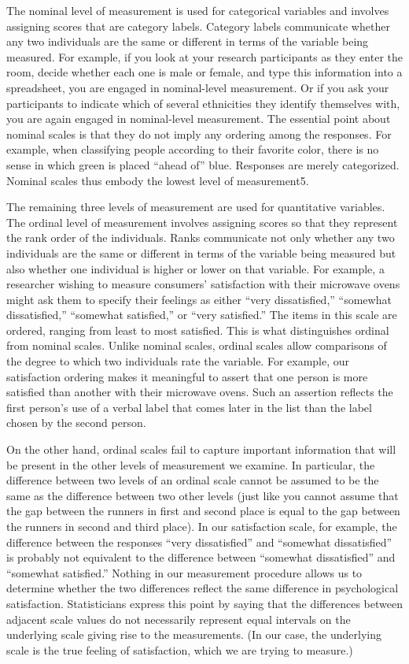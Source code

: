 \documentclass[]{book}
\theoremstyle{definition}
\theoremstyle{definition}
\theoremstyle{remark}
\begin{document}
The nominal level of measurement is used for categorical variables and
involves assigning scores that are category labels. Category labels
communicate whether any two individuals are the same or different in
terms of the variable being measured. For example, if you look at your
research participants as they enter the room, decide whether each one is
male or female, and type this information into a spreadsheet, you are
engaged in nominal-level measurement. Or if you ask your participants to
indicate which of several ethnicities they identify themselves with, you
are again engaged in nominal-level measurement. The essential point
about nominal scales is that they do not imply any ordering among the
responses. For example, when classifying people according to their
favorite color, there is no sense in which green is placed ``ahead of''
blue. Responses are merely categorized. Nominal scales thus embody the
lowest level of measurement5.

The remaining three levels of measurement are used for quantitative
variables. The ordinal level of measurement involves assigning scores so
that they represent the rank order of the individuals. Ranks communicate
not only whether any two individuals are the same or different in terms
of the variable being measured but also whether one individual is higher
or lower on that variable. For example, a researcher wishing to measure
consumers' satisfaction with their microwave ovens might ask them to
specify their feelings as either ``very dissatisfied,'' ``somewhat
dissatisfied,'' ``somewhat satisfied,'' or ``very satisfied.'' The items
in this scale are ordered, ranging from least to most satisfied. This is
what distinguishes ordinal from nominal scales. Unlike nominal scales,
ordinal scales allow comparisons of the degree to which two individuals
rate the variable. For example, our satisfaction ordering makes it
meaningful to assert that one person is more satisfied than another with
their microwave ovens. Such an assertion reflects the first person's use
of a verbal label that comes later in the list than the label chosen by
the second person.

On the other hand, ordinal scales fail to capture important information
that will be present in the other levels of measurement we examine. In
particular, the difference between two levels of an ordinal scale cannot
be assumed to be the same as the difference between two other levels
(just like you cannot assume that the gap between the runners in first
and second place is equal to the gap between the runners in second and
third place). In our satisfaction scale, for example, the difference
between the responses ``very dissatisfied'' and ``somewhat
dissatisfied'' is probably not equivalent to the difference between
``somewhat dissatisfied'' and ``somewhat satisfied.'' Nothing in our
measurement procedure allows us to determine whether the two differences
reflect the same difference in psychological satisfaction. Statisticians
express this point by saying that the differences between adjacent scale
values do not necessarily represent equal intervals on the underlying
scale giving rise to the measurements. (In our case, the underlying
scale is the true feeling of satisfaction, which we are trying to
measure.)
\end{document}
